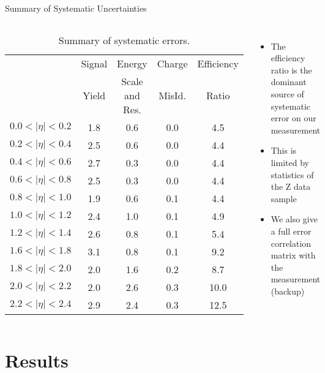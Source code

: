 \documentclass[t, 8pt]{beamer}
\begin{document}
\begin{frame}{Summary of Systematic Uncertainties}
  \begin{columns}[c]
  \tiny{
  \begin{center}
    \begin{table}
    \begin{tabular}{l|cccc}
      \hline\hline
      &Signal & Energy & Charge &  Efficiency \\
     & Yield & Scale and Res. & MisId. & Ratio \\ \hline
      $0.0<|\eta|<0.2$ & 1.8 & 0.6 & 0.0 &  4.5 \\
      $0.2<|\eta|<0.4$ & 2.5 & 0.6 & 0.0 &  4.4 \\
      $0.4<|\eta|<0.6$ & 2.7 & 0.3 & 0.0 &  4.4 \\
      $0.6<|\eta|<0.8$ & 2.5 & 0.3 & 0.0 &  4.4 \\
      $0.8<|\eta|<1.0$ & 1.9 & 0.6 & 0.1 &  4.4 \\
      $1.0<|\eta|<1.2$ & 2.4 & 1.0 & 0.1 &  4.9 \\
      $1.2<|\eta|<1.4$ & 2.6 & 0.8 & 0.1 &  5.4 \\
      $1.6<|\eta|<1.8$ & 3.1 & 0.8 & 0.1 &  9.2 \\
      $1.8<|\eta|<2.0$ & 2.0 & 1.6 & 0.2 &  8.7 \\
      $2.0<|\eta|<2.2$ & 2.0 & 2.6 & 0.3 & 10.0 \\
      $2.2<|\eta|<2.4$ & 2.9 & 2.4 & 0.3 & 12.5 \\
    \end{tabular}
    \caption{\label{tab:systematics} Summary of systematic errors.}%
    \end{table}
  \end{center} 
  }

    \begin{itemize}
      \item The efficiency ratio is the dominant source of systematic error on
      our measurement
      \item This is limited by statistics of the Z data sample
      \item We also give a full error correlation matrix with the measurement
      (backup)
    \end{itemize}
  \end{columns}
\end{frame}

\section{Results}
\end{document}
